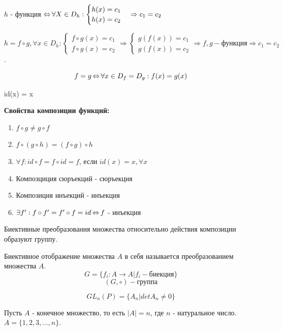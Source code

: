$h$ - функция $\operatorname{\Leftrightarrow} \forall X \in D_h: \begin{cases} h(x) = c_1 \\ h(x) = c_2 \end{cases} \Rightarrow c_1 = c_2$

$h = f \circ g, \forall x \in D_h: \begin{cases} f \circ g(x) = c_1 \\ f \circ g(x) = c_2 \end{cases} \Rightarrow \begin{cases} g(f(x)) = c_1 \\ g(f(x)) = c_2 \end{cases} \Rightarrow f, g - \text{функция} \Rightarrow c_1 = c_2$.

\[ f = g \operatorname{\Leftrightarrow} \forall x \in D_f = D_g: f(x) = g(x) \]

\begin{definition}
	id(x) = x
\end{definition}

\textbf{Свойства композиции функций:}

\begin{enumerate}
	\item $f \circ g \ne g \circ f$
	\item $f \circ (g \circ h) = (f \circ g) \circ h$
	\item $\forall f: id \circ f = f \circ id = f$, если $id(x) = x, \forall x$
	\item Композциция сюръекций - сюръекция
	\item Композиция инъекций - инъекция
	\item $\exists f' : f \circ f' = f' \circ f = id \operatorname{\Leftrightarrow} f$ - инъекция
\end{enumerate}

\begin{theorem}
	Биективные преобразования множества относительно действия композиции образуют группу.
\end{theorem}

\begin{definition}[Преобразование]
	Биективное отображение множества $A$ в себя называется преобразованием множества $A$.
	\[ G = \{ f_i: A \to A | f_i - \text{биекция} \} \]
	\[ (G, \circ) - \text{группа} \]
\end{definition}

\[ GL_n(P) = \{A_n | detA_n \ne 0\} \]

Пусть $A$ - конечное множество, то есть $|A| = n$, где $n$ - натуральное число. $A = \{1, 2, 3, \dots, n\}$.

